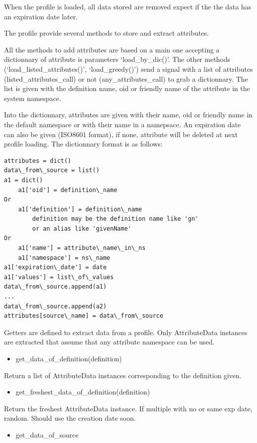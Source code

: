 \documentclass[letterpaper,10pt,english]{sphinxmanual}
\begin{document}
When the profile is loaded, all data stored are removed expect if the
the data has an expiration date later.

The profile provide several methods to store and extract attributes.

All the methods to add attributes are based on a main one accepting a
dictionnary of attribute is parameters `load\_by\_dic()'. The other methods
(`load\_listed\_attributes()', `load\_greedy()') send a signal with a list of
attributes (listed\_attributes\_call) or not (any\_attributes\_call) to grab a
dictionnary. The list is given with the definition name, oid or friendly name
of the attribute in the system namespace.

Into the dictionnary, attributes are given with their name, oid or friendly
name in the default namespace or with their name in a namepsace. An expiration
date can also be given (ISO8601 format), if none, attribute will be deleted at
next profile loading. The dictionnary format is as follows:

\begin{Verbatim}[commandchars=\\\{\}]
attributes = dict()
data\_from\_source = list()
a1 = dict()
    a1['oid'] = definition\_name
Or
    a1['definition'] = definition\_name
        definition may be the definition name like 'gn'
        or an alias like 'givenName'
Or
    a1['name'] = attribute\_name\_in\_ns
    a1['namespace'] = ns\_name
a1['expiration\_date'] = date
a1['values'] = list\_of\_values
data\_from\_source.append(a1)
...
data\_from\_source.append(a2)
attributes[source\_name] = data\_from\_source
\end{Verbatim}

Getters are defined to extract data from a profile. Only AttributeData
instances are extracted that assume that any attribute namespace can be used.
\begin{itemize}
\item {} 
get\_data\_of\_definition(definition)

\end{itemize}

Return a list of AttributeData instances corresponding to the definition
given.
\begin{itemize}
\item {} 
get\_freshest\_data\_of\_definition(definition)

\end{itemize}

Return the freshest AttributeData instance. If multiple with no or same exp
date, random. Should use the creation date soon.
\begin{itemize}
\item {} 
get\_data\_of\_source

\end{itemize}
\end{document}
